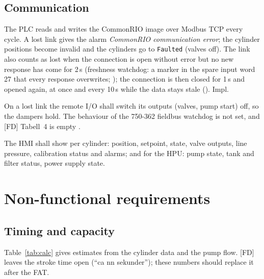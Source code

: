 \documentclass[11pt,a4paper]{article}
\begin{document}
\subsection{Communication}
\begin{description}[nosep, leftmargin=14mm, style=sameline]
  \item[FR-20] The PLC reads and writes the CommonRIO image over Modbus TCP every cycle. A lost link
        gives the alarm \emph{CommonRIO communication error}; the cylinder positions become invalid
        and the cylinders go to \texttt{Faulted} (valves off). The link also counts as lost when the
        connection is open without error but no new response has come for 2\,s (freshness watchdog:
        a marker in the spare input word 27 that every response overwrites; );
        the connection is then closed for 1\,s and opened again, at once and every 10\,s while the
        data stays stale (). \hfill Impl.
  \item[FR-21] On a lost link the remote I/O shall switch its outputs (valves, pump start) off, so
        the dampers hold. The behaviour of the 750-362 fieldbus watchdog is not set, and [FD]
        Tabell~4 is empty .
  \item[FR-22] The HMI shall show per cylinder: position, setpoint, state, valve outputs, line
        pressure, calibration status and alarms; and for the HPU: pump state, tank and filter
        status, power supply state.
\end{description}

\section{Non-functional requirements}
\label{sec:nfreq}

\subsection{Timing and capacity}
\label{sec:timing}
Table~\ref{tab:calc} gives estimates from the cylinder data and the pump flow. [FD] leaves the
stroke time open (``ca nn sekunder''); these numbers should replace it after the FAT.
\end{document}
